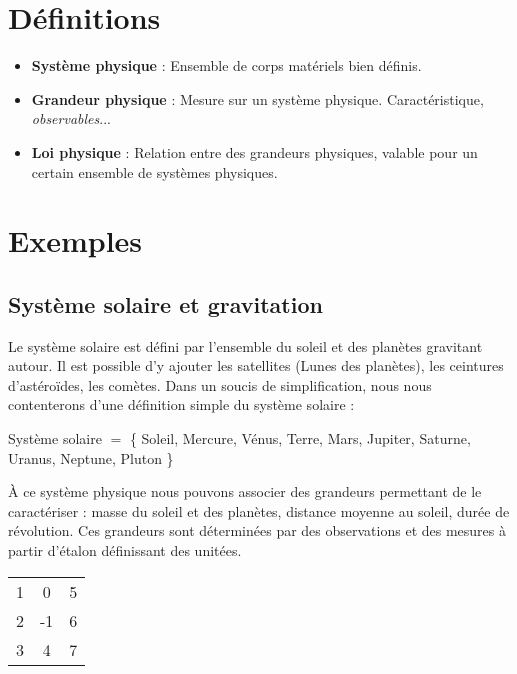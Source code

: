 

\section{Définitions}

	\begin{itemize}[leftmargin=1cm, label=, itemsep=1pt]
		\item {\bf Système physique} : Ensemble de corps matériels bien définis.
		\item {\bf Grandeur physique} : Mesure sur un système physique. Caractéristique, {\it observables}...
		\item {\bf Loi physique} : Relation entre des grandeurs physiques, valable pour un certain ensemble de systèmes physiques.
	\end{itemize}

\section{Exemples}

\subsection{Système solaire et gravitation}

Le système solaire est défini par l'ensemble du soleil et des planètes gravitant autour. Il est possible d'y ajouter les satellites (Lunes des planètes), les ceintures d'astéroïdes, les comètes. Dans un soucis de simplification, nous nous contenterons d'une définition simple du système solaire :
\begin{center}
Système solaire $=$ \{ Soleil, Mercure, Vénus, Terre, Mars, Jupiter, Saturne, Uranus, Neptune, Pluton \}
\end{center}

À ce système physique nous pouvons associer  des grandeurs permettant de le caractériser : masse du soleil et des planètes, distance moyenne au soleil, durée de révolution.
Ces grandeurs sont déterminées par des observations et des mesures à partir d'étalon définissant des unitées.

\begin{tabular}{ c c c }
 1 & 0 & 5 \\ 2 & -1 & 6 \\ 3 & 4 & 7 \\
\end{tabular}





